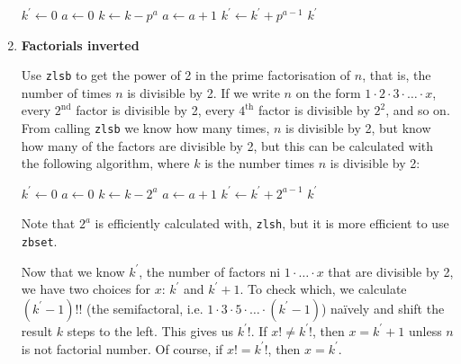 \begin{enumerate}[label=\textbf{\arabic*}.]
\vspace{1em}
\hspace{-2.8ex}
\begin{minipage}{\linewidth}
\begin{algorithmic}
    \STATE $k^\prime \gets 0$
      \STATE $a \gets 0$
        \STATE $k \gets k - p^a$
        \STATE $a \gets a + 1$
      \ENDWHILE
      \STATE $k^\prime \gets k^\prime + p^{a - 1}$
    \ENDWHILE
    \RETURN $k^\prime$
\end{algorithmic}
\end{minipage}
\vspace{1em}



\item \textbf{Factorials inverted}

Use \texttt{zlsb} to get the power of 2 in the
prime factorisation of $n$, that is, the number
of times $n$ is divisible by 2. If we write $n$ on
the form $1 \cdot 2 \cdot 3 \cdot \ldots \cdot x$,
every $2^\text{nd}$ factor is divisible by 2, every
$4^\text{th}$ factor is divisible by $2^2$, and so on.
From calling \texttt{zlsb} we know how many times,
$n$ is divisible by 2, but know how many of the factors
are divisible by 2, but this can be calculated with
the following algorithm, where $k$ is the number
times $n$ is divisible by 2:

\vspace{1em}
\hspace{-2.8ex}
\begin{minipage}{\linewidth}
\begin{algorithmic}
    \STATE $k^\prime \gets 0$
      \STATE $a \gets 0$
        \STATE $k \gets k - 2^a$
        \STATE $a \gets a + 1$
      \ENDWHILE
      \STATE $k^\prime \gets k^\prime + 2^{a - 1}$
    \ENDWHILE
    \RETURN $k^\prime$
\end{algorithmic}
\end{minipage}
\vspace{1em}

\noindent
Note that $2^a$ is efficiently calculated with,
\texttt{zlsh}, but it is more efficient to use
\texttt{zbset}.

Now that we know $k^\prime$, the number of
factors ni $1 \cdot \ldots \cdot x$ that are
divisible by 2, we have two choices for $x$:
$k^\prime$ and $k^\prime + 1$. To check which, we
calculate $(k^\prime - 1)!!$ (the semifactoral, i.e.
$1 \cdot 3 \cdot 5 \cdot \ldots \cdot (k^\prime - 1)$)
naïvely and shift the result $k$ steps to the left.
This gives us $k^\prime!$. If $x! \neq k^\prime!$, then
$x = k^\prime + 1$ unless $n$ is not factorial number.
Of course, if $x! = k^\prime!$, then $x = k^\prime$.




\end{enumerate}
